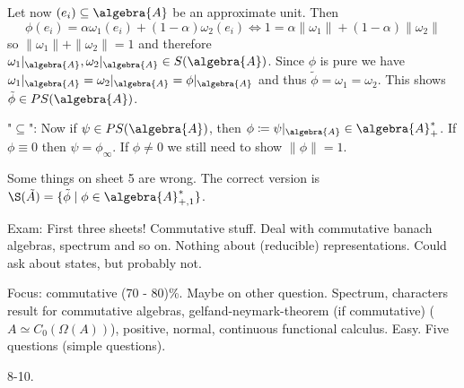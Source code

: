 \documentclass[a4paper]{article}
\begin{document}
\begin{exercise}[05-01]

	Let now $(e_i) \subseteq \algebra{A}$ be an approximate unit. Then 
	\begin{equation*}
		\phi(e_i) = \alpha \omega_1(e_i) + (1 - \alpha) \omega_2(e_i) \iff 1 = \alpha \|\omega_1\| + (1 - \alpha) \|\omega_2\|
	\end{equation*}
	so $\|\omega_1\| + \|\omega_2\| = 1$ and therefore $\omega_1|_\algebra{A}, \omega_2|_\algebra{A} \in S(\algebra{A})$.
	Since $\phi$ is pure we have $\omega_1|_\algebra{A} = \omega_2|_\algebra{A} = \phi|_\algebra{A}$ and thus $\tilde{\phi} = \omega_1 = \omega_2$.
	This shows $\tilde{\phi} \in PS(\algebra{A})$.

	"$\subseteq$": Now if $\psi \in PS(\algebra{A})$, then $\phi \coloneq \psi|_\algebra{A} \in \algebra{A}_+^*$.
	If $\phi \equiv 0$ then $\psi = \phi_\infty$.
	If $\phi \neq 0$ we still need to show $\|\phi\| = 1$.

	

	Some things on sheet 5 are wrong.
	The correct version is $\S(\tilde{A}) = \{ \tilde{\phi} \mid \phi \in \algebra{A}^*_{+,1}\}$. 
\end{exercise}


\begin{remark}[Exam]
	Exam: First three sheets! Commutative stuff. Deal with commutative banach algebras, spectrum and so on. Nothing about (reducible) representations. Could ask about states, but probably not.

	Focus: commutative (70 - 80)\%. Maybe on other question. Spectrum, characters result for commutative algebras, gelfand-neymark-theorem (if commutative) ($A \simeq C_0(\Omega(A))$), positive, normal, continuous functional calculus. Easy. Five questions (simple questions).

	8-10.
\end{remark}
\end{document}

